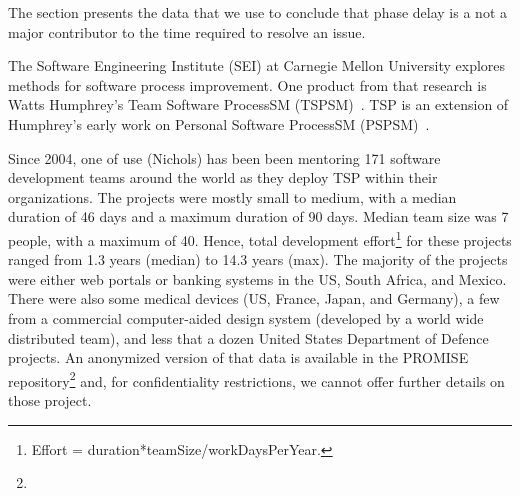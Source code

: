 The section presents the data that we use to conclude that phase delay is a not a major
contributor to the time required to resolve an issue.  

The Software Engineering Institute (SEI) at
Carnegie Mellon University explores methods for software process improvement.
One product from that research is  
Watts Humphrey's  Team Software ProcessSM (TSPSM)~\cite{tsp00}. TSP is an extension of Humphrey's early
work on Personal Software
ProcessSM (PSPSM)~\cite{psp05}.


Since 2004, one  of use (Nichols) has been been mentoring 171 software development teams around the world
as they  deploy TSP within their organizations.  
The projects
were mostly small to medium, with a median duration of 46 days
and a maximum duration of 90 days. Median team size was 7
people, with a maximum of 40. Hence,  total development 
effort\footnote{
Effort =  duration*teamSize/workDaysPerYear.} for
these projects ranged from 1.3 years (median) to 14.3 years (max).
The majority of
the projects were either web portals or banking systems in the US, South Africa, and Mexico. 
There were also some  medical devices (US, France, Japan, and Germany),  a few from a commercial 
computer-aided design system (developed by a world wide distributed team), and less that  
a dozen United States
Department of Defence projects.
 An anonymized version of that data is available in the PROMISE repository\footnote{} and,
 for confidentiality restrictions, we cannot offer 
further details
on those project.  


